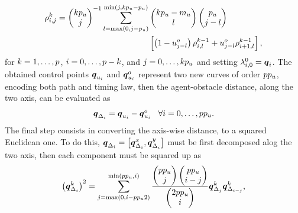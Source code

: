 \begin{equation}%
    \label{EQ:ST-BEZIER-COMPOSITION-C}
    \begin{split}
        \rho_{i,j}^k =
        \begin{pmatrix}
            k \order_{\splinevar} \\ j
        \end{pmatrix}^{-1}
        \sum_{l = \max \lp 0, j - \order_{\splinevar} \rp}^{\min \lp j, k \order_{\splinevar} - \order_{\splinevar} \rp} &
        \begin{pmatrix}
            k \order_{\splinevar} - \cpnumber_u \\ l
        \end{pmatrix}
        \begin{pmatrix}
            \order_{\splinevar} \\ j-l
        \end{pmatrix} \\
        & \lps \lp 1-\splinevar^o_{j-l} \rp \rho_{i,l}^{k-1} + \splinevar^o_{j-l}\rho_{i+1,l}^{k-1} \rps,
    \end{split}
\end{equation}
for $k = 1, \dots, p$, $i = 0, \dots, p-k$, and $j = 0, \dots, kp_{u}$ and setting
$\lambda_{i,0}^{0} = \boldsymbol{q}_i$. The obtained control points $\boldsymbol{q}_{u_i}$ and
$\boldsymbol{q}_{u_i}^o$ represent two new curves of order $p p_{u}$, encoding both
path and timing law, then the agent-obstacle distance, along the two axis, can be evaluated as
\begin{equation}%
    \label{EQ:ST-BEZIER-COMPOSITION-D}
    \bs{\cpoint}_{\Delta_i} = \bs{\cpoint}_{\splinevar_i} - \bs{\cpoint}_{\splinevar_i}^o \hspace{0.3cm} \forall i = 0, \dots, \order \order_{\splinevar}.
\end{equation}
The final step consists in converting the axis-wise distance, to a squared Euclidean one.
To do this, $\boldsymbol{q}_{\Delta_i} = \left[ \boldsymbol{q}_{\Delta_i}^x, \boldsymbol{q}_{\Delta_i}^y\right]$
must be first decomposed alog the two axis, then each component must be squared up as
\begin{equation}%
    \label{EQ:ST-BEZIER-COMPOSITION-E}
    \lp \bs{\cpoint}_{\Delta_i}^k \rp^2 =
    \sum_{j = \max \lp 0, i-\order \order_{\splinevar}2 \rp}^{\min \lp \order \order_{\splinevar}, i \rp}
    \frac{
        \begin{pmatrix}
            \order \order_{\splinevar} \\ j
        \end{pmatrix}
        \begin{pmatrix}
            \order \order_{\splinevar} \\ i-j
        \end{pmatrix}
    }{
        \begin{pmatrix}
            2\order \order_{\splinevar} \\ i
        \end{pmatrix}
    }
    \bs{\cpoint}_{\Delta_j}^k \bs{\cpoint}_{\Delta_{i-j}}^k,
\end{equation}
